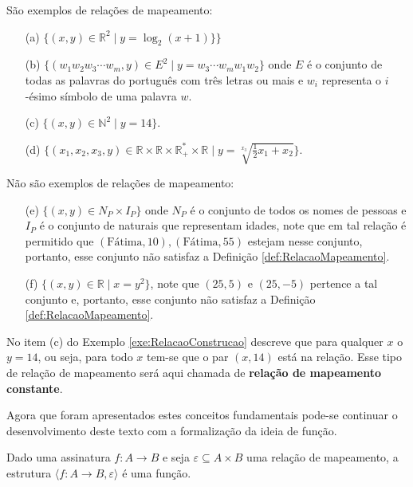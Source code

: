 \begin{exemplo}\label{exe:RelacaoConstrucao}
	São exemplos de relações de mapeamento:
	\begin{itemize}
		\item[(a)] $\{(x, y) \in \mathbb{R}^2 \mid y = \log_2(x + 1)\}\}$
		\item[(b)] $\{(w_1w_2w_3\cdots w_m, y) \in E^2 \mid y = w_3\cdots w_mw_1w_2\}$ onde $E$ é o conjunto de todas as palavras do português com três letras ou mais e $w_i$ representa o $i$-ésimo símbolo de uma palavra $w$.
		\item[(c)] $\{(x, y) \in \mathbb{N}^2 \mid y = 14\}$.
		\item[(d)] $\Big\{(x_1, x_2, x_3, y) \in \mathbb{R} \times \mathbb{R} \times \mathbb{R}^*_+ \times \mathbb{R} \mid y = \sqrt[x_3]{\displaystyle\frac{1}{2}x_1 + x_2}\Big\}$.
	\end{itemize}
	Não são exemplos de relações de mapeamento:
	\begin{itemize}
		\item[(e)] $\{(x, y) \in N_P \times I_P\}$ onde $N_P$ é o conjunto de todos os nomes de pessoas e $I_P$ é o conjunto de naturais que representam idades, note que em tal relação é permitido que $(\text{Fátima}, 10), (\text{Fátima}, 55)$ estejam nesse conjunto, portanto, esse conjunto não satisfaz a Definição \ref{def:RelacaoMapeamento}.
		\item[(f)] $\{(x, y) \in \mathbb{R}  \mid x = y^2\}$, note que $(25, 5)$ e $(25, -5)$ pertence a tal conjunto e, portanto, esse conjunto não satisfaz a Definição \ref{def:RelacaoMapeamento}.
	\end{itemize}
\end{exemplo}

\begin{nota}
  No item (c) do Exemplo \ref{exe:RelacaoConstrucao} descreve que para qualquer $x$ o $y = 14$, ou seja, para todo $x$ tem-se que o par $(x, 14)$ está na relação. Esse tipo de relação de mapeamento será aqui chamada de \textbf{relação de mapeamento constante}. 
\end{nota}

Agora que foram apresentados estes conceitos fundamentais pode-se continuar o desenvolvimento deste texto com a formalização da ideia de função.

\begin{definicao}[Função]\label{def:Funcao}
	Dado uma assinatura $f: A \rightarrow B$ e seja $\varepsilon \subseteq A \times B$ uma relação de mapeamento, a estrutura $\langle f: A \rightarrow B, \varepsilon \rangle$ é uma função.
\end{definicao}

